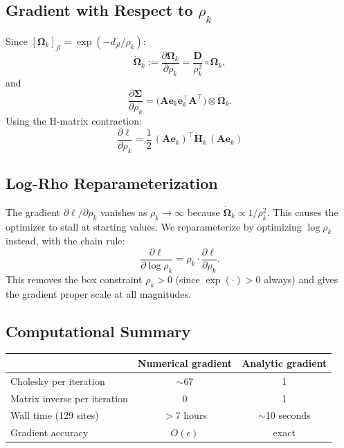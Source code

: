 \documentclass[11pt]{article}
\newcommand{\bA}{\mathbf{A}}
\newcommand{\bSigma}{\bm{\Sigma}}
\newcommand{\bOmega}{\bm{\Omega}}
\newcommand{\be}{\mathbf{e}}
\begin{document}
\subsection{Gradient with Respect to $\rho_k$}

Since $[\bOmega_k]_{jl} = \exp(-d_{jl}/\rho_k)$:
\[
\dot{\bOmega}_k := \frac{\partial \bOmega_k}{\partial \rho_k} = \frac{\mathbf{D}}{\rho_k^2} \circ \bOmega_k,
\]
and
\begin{equation}\label{eq:dsigma_drho}
\frac{\partial \bSigma}{\partial \rho_k} = \bigl(\bA\be_k\be_k^\top\bA^\top\bigr) \otimes \dot{\bOmega}_k.
\end{equation}
Using the H-matrix contraction:
\begin{equation}\label{eq:grad_rho}
\boxed{\frac{\partial \ell}{\partial \rho_k} = \frac{1}{2}\, (\bA\be_k)^\top \dot{\mathbf{H}}_k\, (\bA\be_k)}
\end{equation}

\subsection{Log-Rho Reparameterization}

The gradient $\partial\ell/\partial\rho_k$ vanishes as $\rho_k \to \infty$ because $\dot{\bOmega}_k \propto 1/\rho_k^2$. This causes the optimizer to stall at starting values. We reparameterize by optimizing $\log\rho_k$ instead, with the chain rule:
\begin{equation}
\frac{\partial \ell}{\partial \log\rho_k} = \rho_k \cdot \frac{\partial \ell}{\partial \rho_k}.
\end{equation}
This removes the box constraint $\rho_k > 0$ (since $\exp(\cdot) > 0$ always) and gives the gradient proper scale at all magnitudes.

\subsection{Computational Summary}

\begin{center}
\begin{tabular}{@{}lcc@{}}
\toprule
& Numerical gradient & Analytic gradient \\
\midrule
Cholesky per iteration & $\sim$67 & 1 \\
Matrix inverse per iteration & 0 & 1 \\
Wall time (129 sites) & $>$7 hours & $\sim$10 seconds \\
Gradient accuracy & $O(\epsilon)$ & exact \\
\bottomrule
\end{tabular}
\end{center}
\end{document}
